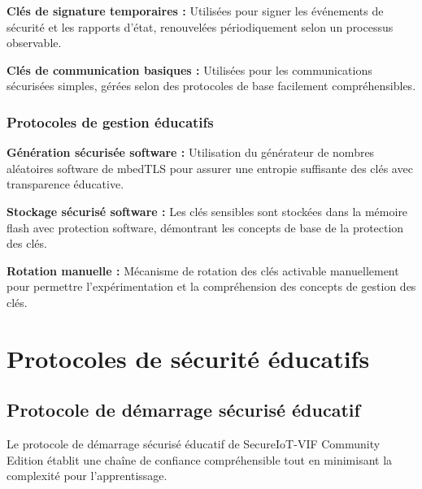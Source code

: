 \textbf{Clés de signature temporaires :} Utilisées pour signer les événements de sécurité et les rapports d'état, renouvelées périodiquement selon un processus observable.

\textbf{Clés de communication basiques :} Utilisées pour les communications sécurisées simples, gérées selon des protocoles de base facilement compréhensibles.

\subsubsection{Protocoles de gestion éducatifs}

\textbf{Génération sécurisée software :} Utilisation du générateur de nombres aléatoires software de mbedTLS pour assurer une entropie suffisante des clés avec transparence éducative.

\textbf{Stockage sécurisé software :} Les clés sensibles sont stockées dans la mémoire flash avec protection software, démontrant les concepts de base de la protection des clés.

\textbf{Rotation manuelle :} Mécanisme de rotation des clés activable manuellement pour permettre l'expérimentation et la compréhension des concepts de gestion des clés.

\section{Protocoles de sécurité éducatifs}

\subsection{Protocole de démarrage sécurisé éducatif}

Le protocole de démarrage sécurisé éducatif de SecureIoT-VIF Community Edition établit une chaîne de confiance compréhensible tout en minimisant la complexité pour l'apprentissage.

